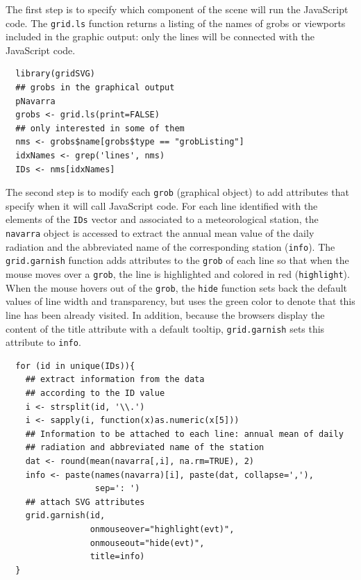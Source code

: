 \documentclass[smallroyalvopaper]{memoir}
\begin{document}
The first step is to specify which component of the scene
will run the JavaScript code. The \texttt{grid.ls} function  returns a
listing of the names of grobs or viewports included in the graphic
output: only the lines will be connected with the JavaScript
code. 


\lstset{language=r,label= ,caption= ,captionpos=b,numbers=none}
\begin{lstlisting}
  library(gridSVG)
  ## grobs in the graphical output
  pNavarra
  grobs <- grid.ls(print=FALSE)
  ## only interested in some of them
  nms <- grobs$name[grobs$type == "grobListing"]
  idxNames <- grep('lines', nms)
  IDs <- nms[idxNames]
\end{lstlisting}

The second step is to modify each \texttt{grob} (graphical object) to add
attributes that specify when it will call JavaScript code. For each
line identified with the elements of the \texttt{IDs} vector and associated
to a meteorological station, the \texttt{navarra} object is accessed to
extract the annual mean value of the daily radiation and the
abbreviated name of the corresponding station (\texttt{info}).  The
\texttt{grid.garnish} function adds attributes to the \texttt{grob} of each line so
that when the mouse moves over a \texttt{grob}, the line is highlighted and
colored in red (\texttt{highlight}). When the mouse hovers out of the \texttt{grob},
the \texttt{hide} function sets back the default values of line width and
transparency, but uses the green color to denote that this line has
been already visited. In addition, because the browsers display the
content of the title attribute with a default tooltip, \texttt{grid.garnish}
sets this attribute to \texttt{info}.


\lstset{language=r,label= ,caption= ,captionpos=b,numbers=none}
\begin{lstlisting}
  for (id in unique(IDs)){
    ## extract information from the data
    ## according to the ID value
    i <- strsplit(id, '\\.')
    i <- sapply(i, function(x)as.numeric(x[5]))
    ## Information to be attached to each line: annual mean of daily
    ## radiation and abbreviated name of the station
    dat <- round(mean(navarra[,i], na.rm=TRUE), 2)
    info <- paste(names(navarra)[i], paste(dat, collapse=','),
                  sep=': ')
    ## attach SVG attributes
    grid.garnish(id,
                 onmouseover="highlight(evt)",
                 onmouseout="hide(evt)",
                 title=info)
  }
\end{lstlisting}
\end{document}
